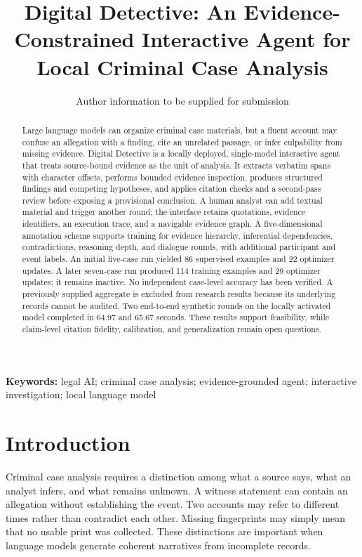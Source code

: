 \documentclass[10pt,a4paper]{article}
\title{\bfseries Digital Detective: An Evidence-Constrained Interactive Agent for Local Criminal Case Analysis}
\author{Author information to be supplied for submission}
\date{}
\begin{document}
\maketitle
\begin{abstract}
Large language models can organize criminal case materials, but a fluent account may confuse an allegation with a finding, cite an unrelated passage, or infer culpability from missing evidence. Digital Detective is a locally deployed, single-model interactive agent that treats source-bound evidence as the unit of analysis. It extracts verbatim spans with character offsets, performs bounded evidence inspection, produces structured findings and competing hypotheses, and applies citation checks and a second-pass review before exposing a provisional conclusion. A human analyst can add textual material and trigger another round; the interface retains quotations, evidence identifiers, an execution trace, and a navigable evidence graph. A five-dimensional annotation scheme supports training for evidence hierarchy, inferential dependencies, contradictions, reasoning depth, and dialogue rounds, with additional participant and event labels. An initial five-case run yielded 86 supervised examples and 22 optimizer updates. A later seven-case run produced 114 training examples and 29 optimizer updates; it remains inactive. No independent case-level accuracy has been verified. A previously supplied aggregate is excluded from research results because its underlying records cannot be audited. Two end-to-end synthetic rounds on the locally activated model completed in 64.97 and 65.67 seconds. These results support feasibility, while claim-level citation fidelity, calibration, and generalization remain open questions.
\end{abstract}
\noindent\textbf{Keywords:} legal AI; criminal case analysis; evidence-grounded agent; interactive investigation; local language model

\section{Introduction}
Criminal case analysis requires a distinction among what a source says, what an analyst infers, and what remains unknown. A witness statement can contain an allegation without establishing the event. Two accounts may refer to different times rather than contradict each other. Missing fingerprints may simply mean that no usable print was collected. These distinctions are important when language models generate coherent narratives from incomplete records.
\end{document}
